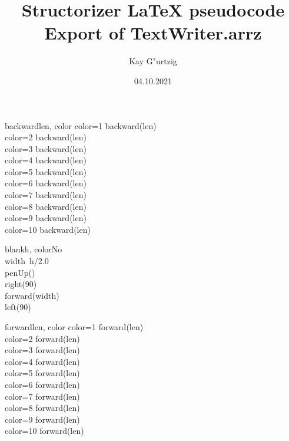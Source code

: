 \documentclass[a4paper,10pt]{article}
\title{Structorizer LaTeX pseudocode Export of TextWriter.arrz}
\author{Kay G"urtzig}
\date{04.10.2021}
\begin{document}
\begin{pseudocode}{backward}{len, color }
\label{backward}
  \IF color=1 \THEN
    backward(len)\\
  \ELSEIF color=2 \THEN
    backward(len)\\
  \ELSEIF color=3 \THEN
    backward(len)\\
  \ELSEIF color=4 \THEN
    backward(len)\\
  \ELSEIF color=5 \THEN
    backward(len)\\
  \ELSEIF color=6 \THEN
    backward(len)\\
  \ELSEIF color=7 \THEN
    backward(len)\\
  \ELSEIF color=8 \THEN
    backward(len)\\
  \ELSEIF color=9 \THEN
    backward(len)\\
  \ELSEIF color=10 \THEN
    backward(len)\\
\ENDPROCEDURE
\end{pseudocode}


\begin{pseudocode}{blank}{h, colorNo }
\label{blank}
\\
  width\gets\ h/2.0\\
  penUp()\\
  right(90)\\
  forward(width)\\
  left(90)\\
\ENDPROCEDURE
\end{pseudocode}


\begin{pseudocode}{forward}{len, color }
\label{forward}
  \IF color=1 \THEN
    forward(len)\\
  \ELSEIF color=2 \THEN
    forward(len)\\
  \ELSEIF color=3 \THEN
    forward(len)\\
  \ELSEIF color=4 \THEN
    forward(len)\\
  \ELSEIF color=5 \THEN
    forward(len)\\
  \ELSEIF color=6 \THEN
    forward(len)\\
  \ELSEIF color=7 \THEN
    forward(len)\\
  \ELSEIF color=8 \THEN
    forward(len)\\
  \ELSEIF color=9 \THEN
    forward(len)\\
  \ELSEIF color=10 \THEN
    forward(len)\\
\ENDPROCEDURE
\end{pseudocode}
\end{document}
